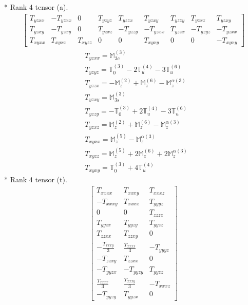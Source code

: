 \documentclass[fleqn,8pt,landscape]{jsarticle}
\begin{document}
* Rank 4 tensor (a).
\begin{align*}
\begin{bmatrix} T_{yzxx} & - T_{yzxx} & 0 & T_{yzyz} & T_{yzzx} & T_{yzxy} & T_{yzzy} & T_{yzxz} & T_{yzxy} \\ T_{yzxy} & - T_{yzxy} & 0 & T_{yzxz} & - T_{yzzy} & - T_{yzxx} & T_{yzzx} & - T_{yzyz} & - T_{yzxx} \\ T_{xyxx} & T_{xyxx} & T_{xyzz} & 0 & 0 & T_{xyxy} & 0 & 0 & - T_{xyxy} \end{bmatrix}
\end{align*}
\begin{align*}
& T_{yzxx} = \mathbb{M}_{3c}^{(3)} \\
& T_{yzyz} = \mathbb{T}_{0}^{(3)} - 2 \mathbb{T}_{u}^{(4)} - 3 \mathbb{T}_{u}^{(6)} \\
& T_{yzzx} = - \mathbb{M}_{z}^{(2)} + \mathbb{M}_{z}^{(6)} - \mathbb{M}_{z}^{\alpha(3)} \\
& T_{yzxy} = \mathbb{M}_{3s}^{(3)} \\
& T_{yzzy} = - \mathbb{T}_{0}^{(3)} + 2 \mathbb{T}_{u}^{(4)} - 3 \mathbb{T}_{u}^{(6)} \\
& T_{yzxz} = \mathbb{M}_{z}^{(2)} + \mathbb{M}_{z}^{(6)} - \mathbb{M}_{z}^{\alpha(3)} \\
& T_{xyxx} = \mathbb{M}_{z}^{(5)} - \mathbb{M}_{z}^{\alpha(3)} \\
& T_{xyzz} = \mathbb{M}_{z}^{(5)} + 2 \mathbb{M}_{z}^{(6)} + 2 \mathbb{M}_{z}^{\alpha(3)} \\
& T_{xyxy} = \mathbb{T}_{0}^{(3)} + 4 \mathbb{T}_{u}^{(4)}
\end{align*}
* Rank 4 tensor (t).
\begin{align*}
\begin{bmatrix} T_{xxxx} & T_{xxxy} & T_{xxxz} \\ - T_{xxxy} & T_{xxxx} & T_{yyyz} \\ 0 & 0 & T_{zzzz} \\ T_{yyzx} & T_{yyzy} & T_{yyzz} \\ T_{zzxx} & T_{zzxy} & 0 \\ - \frac{T_{xxxy}}{3} & \frac{T_{xxxx}}{3} & - T_{yyyz} \\ - T_{zzxy} & T_{zzxx} & 0 \\ - T_{yyzx} & - T_{yyzy} & T_{yyzz} \\ \frac{T_{xxxx}}{3} & \frac{T_{xxxy}}{3} & - T_{xxxz} \\ - T_{yyzy} & T_{yyzx} & 0 \end{bmatrix}
\end{align*}
\end{document}
